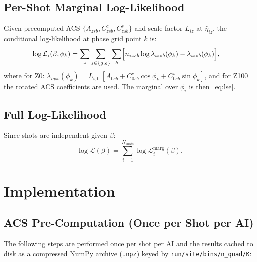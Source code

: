\documentclass[11pt,a4paper]{article}
\newcommand{\Lcal}{\mathcal{L}}
\begin{document}
\subsection{Per-Shot Marginal Log-Likelihood}

Given precomputed ACS $\{A_{zsb}, C^c_{zsb}, C^s_{zsb}\}$ and scale factor
$L_{iz}$ at $\hat\eta_{iz}$, the conditional log-likelihood at phase grid
point $k$ is:
\begin{align}
  \log\Lcal_i(\beta,\phi_k)
  &= \sum_z \sum_{s \in \{g,e\}} \sum_b
     \Bigl[n_{izsb}\log\lambda_{izsb}(\phi_k)
           - \lambda_{izsb}(\phi_k)\Bigr],
  \label{eq:ll_phik}
\end{align}
where for Z0: $\lambda_{igsb}(\phi_k) = L_{i,0}\,[A_{0sb} +
C^c_{0sb}\cos\phi_k + C^s_{0sb}\sin\phi_k]$, and for Z100 the rotated ACS
coefficients are used.  The marginal over $\phi_i$ is then~\eqref{eq:lse}.

\subsection{Full Log-Likelihood}

Since shots are independent given $\beta$:
\begin{equation}
  \log\Lcal(\beta)
  = \sum_{i=1}^{N_\mathrm{shots}} \log\Lcal_i^\mathrm{marg}(\beta).
  \label{eq:full_ll}
\end{equation}

\section{Implementation}
\label{sec:impl}

\subsection{ACS Pre-Computation (Once per Shot per AI)}

The following steps are performed once per shot per AI and the results cached
to disk as a compressed NumPy archive (\texttt{.npz}) keyed by
\texttt{run/site/bins/n\_quad/K}:
\end{document}
